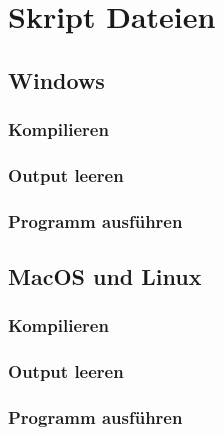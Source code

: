 \section{Skript Dateien}
\subsection{Windows}
\subsubsection{Kompilieren}

\clearpage
%
\subsubsection{Output leeren}

\clearpage
%
\subsubsection{Programm ausführen}

\clearpage
%
\subsection{MacOS und Linux}
\subsubsection{Kompilieren}
%
\clearpage
%
\subsubsection{Output leeren}
%
\clearpage
%
\subsubsection{Programm ausführen}
%
\cleardoublepage